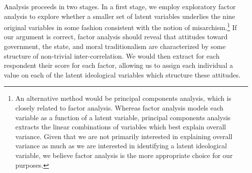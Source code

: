 \documentclass[12pt,]{article}
\let\rmarkdownfootnote\footnote%
\def\footnote{\protect\rmarkdownfootnote}
\begin{document}
Analysis proceeds in two stages. In a first stage, we employ exploratory
factor analysis to explore whether a smaller set of latent variables
underlies the nine original variables in some fashion consistent with
the notion of
misarchism.\footnote{An alternative method would be principal components analysis, which is closely related to factor analysis. Whereas factor analysis models each variable as a function of a latent variable, principal components analysis extracts the linear combinations of variables which best explain overall variance. Given that we are not primarily interested in explaining overall variance as much as we are interested in identifying a latent ideological variable, we believe factor analysis is the more appropriate choice for our purposes.}
If our argument is correct, factor analysis should reveal that attitudes
toward government, the state, and moral traditionalism are characterized
by some structure of non-trivial inter-correlation. We would then
extract for each respondent their score for each factor, allowing us to
assign each individual a value on each of the latent ideological
variables which structure these attitudes.
\end{document}
